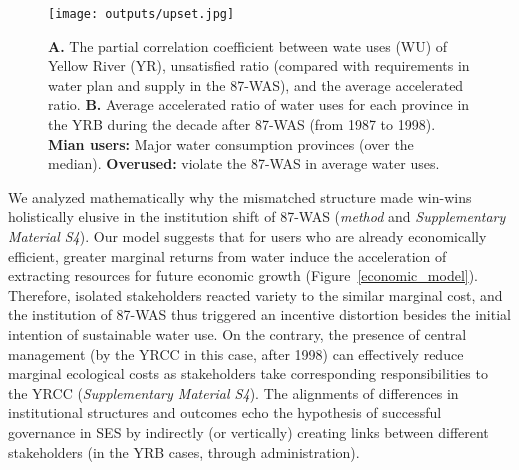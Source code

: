 \begin{figure*}[!h]
    \centering
    \texttt{[image: outputs/upset.jpg]}
    \caption{
        \textbf{A.} The partial correlation coefficient between wate uses (WU) of Yellow River (YR), unsatisfied ratio (compared with requirements in water plan and supply in the 87-WAS), and the average accelerated ratio.
        \textbf{B.} Average accelerated ratio of water uses for each province in the YRB during the decade after 87-WAS (from 1987 to 1998).
        \textbf{Mian users:} Major water consumption provinces (over the median).
        \textbf{Overused:} violate the 87-WAS in average water uses.
    }
    \label{upset}
\end{figure*}

We analyzed mathematically why the mismatched structure made win-wins holistically elusive in the institution shift of 87-WAS (\textit{method} and \textit{Supplementary Material S4}).
Our model suggests that for users who are already economically efficient, greater marginal returns from water induce the acceleration of extracting resources for future economic growth (Figure~\ref{economic_model}).
Therefore, isolated stakeholders reacted variety to the similar marginal cost, and the institution of 87-WAS thus triggered an incentive distortion besides the initial intention of sustainable water use.
On the contrary, the presence of central management (by the YRCC in this case, after 1998) can effectively reduce marginal ecological costs as stakeholders take corresponding responsibilities to the YRCC (\textit{Supplementary Material S4}).
The alignments of differences in institutional structures and outcomes echo the hypothesis of successful governance in SES by indirectly (or vertically) creating links between different stakeholders (in the YRB cases, through administration).

